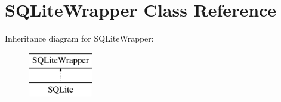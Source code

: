 \hypertarget{class_s_q_lite_wrapper}{}\section{S\+Q\+Lite\+Wrapper Class Reference}
\label{class_s_q_lite_wrapper}
Inheritance diagram for S\+Q\+Lite\+Wrapper\+:\begin{figure}[H]
\begin{center}
\leavevmode
\includegraphics[height=2.000000cm]{da/d65/class_s_q_lite_wrapper}
\end{center}
\end{figure}
